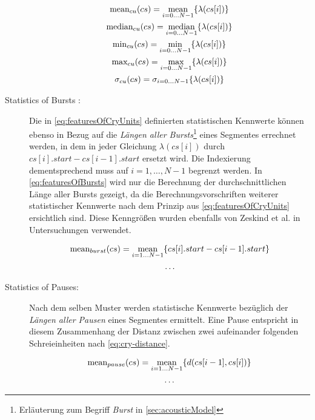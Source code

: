 \begin{description}
\begin{equation}
\begin{gathered}
\text{mean}_{cu}(cs) = \operatorname*{mean}_{i = 0 \ldots N-1}\{\lambda(cs[i])\} \\
\text{median}_{cu}(cs) = \operatorname*{median}_{i = 0 \ldots N-1}\{\lambda(cs[i])\} \\
\text{min}_{cu}(cs) = \operatorname*{min}_{i = 0 \ldots N-1}\{\lambda(cs[i])\} \\
\text{max}_{cu}(cs) = \operatorname*{max}_{i = 0 \ldots N-1}\{\lambda(cs[i])\} \\
\sigma_{cu}(cs) =  \sigma_{i = 0 \ldots N-1}\{\lambda(cs[i])\} 
\end{gathered}
\label{eq:featuresOfCryUnits}
\end{equation}

\item[Statistics of Bursts :] Die in \autoref{eq:featuresOfCryUnits} definierten statistischen Kennwerte können ebenso in Bezug auf die \emph{Längen aller Bursts}\footnote{Erläuterung zum Begriff \emph{Burst} in \autoref{sec:acousticModel}} eines Segmentes errechnet werden, in dem in jeder Gleichung $\lambda(cs[i])$ durch $cs[i].start - cs[i-1].start$ ersetzt wird. Die Indexierung dementsprechend muss auf $i = 1 ,\ldots, N-1$ begrenzt werden. In \autoref{eq:featuresOfBursts} wird nur die Berechnung der durchschnittlichen Länge aller Bursts gezeigt, da die Berechnungsvorschriften weiterer statistischer Kennwerte nach dem Prinzip aus \autoref{eq:featuresOfCryUnits} ersichtlich sind. Diese Kenngrößen wurden ebenfalls von Zeskind et al. \cite{rythmic} in Untersuchungen verwendet.

\begin{equation}
\begin{gathered}
\text{mean}_{burst}(cs) = \operatorname*{mean}_{i = 1 \ldots N-1}\{cs[i].start - cs[i-1].start\} \\
\ldots
\end{gathered}
\label{eq:featuresOfBursts}
\end{equation}

\item[Statistics of Pauses:] Nach dem selben Muster werden statistische Kennwerte bezüglich der  \emph{Längen aller Pausen} eines Segmentes ermittelt. Eine Pause entspricht in diesem Zusammenhang der Distanz zwischen zwei aufeinander folgenden Schreieinheiten nach \autoref{eq:cry-distance}.

\begin{equation}
\begin{gathered}
\text{mean}_{pause}(cs) = \operatorname*{mean}_{i = 1 \ldots N-1}\{d(cs[i-1],cs[i])\} \\
\ldots
\end{gathered}
\label{eq:featuresOfPauses}
\end{equation}


\end{description}
